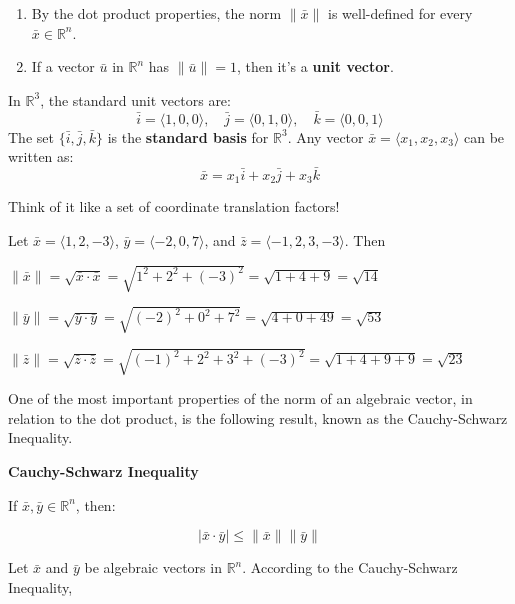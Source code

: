 \begin{notebox}
\begin{enumerate}
\item By the dot product properties, the norm $\|\bar{x}\|$ is well-defined for every $\bar{x} \in \mathbb{R}^n$.
\item If a vector $\bar{u}$ in $\mathbb{R}^n$ has $\|\bar{u}\| = 1$, then it's a \textbf{unit vector}.
\end{enumerate}

In $\mathbb{R}^3$, the standard unit vectors are:
\[
\bar{i} = \langle 1, 0, 0 \rangle, \quad \bar{j} = \langle 0, 1, 0 \rangle, \quad \bar{k} = \langle 0, 0, 1 \rangle
\]
The set $\{\bar{i}, \bar{j}, \bar{k}\}$ is the \textbf{standard basis} for $\mathbb{R}^3$. 
Any vector $\bar{x} = \langle x_1, x_2, x_3 \rangle$ can be written as:
\[
\bar{x} = x_1 \bar{i} + x_2 \bar{j} + x_3 \bar{k}
\]

Think of it like a set of coordinate translation factors!
\end{notebox}

\begin{examplebox}
  Let $\bar{x} = \langle 1,2,-3 \rangle$, $\bar{y} = \langle -2,0,7 \rangle$, and $\bar{z} = \langle -1,2,3,-3 \rangle$. Then

\quad $\|\bar{x}\| = \sqrt{\bar{x} \cdot \bar{x}} = \sqrt{1^2 + 2^2 + (-3)^2} = \sqrt{1 + 4 + 9} = \sqrt{14}$

\quad $\|\bar{y}\| = \sqrt{\bar{y} \cdot \bar{y}} = \sqrt{(-2)^2 + 0^2 + 7^2} = \sqrt{4 + 0 + 49} = \sqrt{53}$

\quad $\|\bar{z}\| = \sqrt{\bar{z} \cdot \bar{z}} = \sqrt{(-1)^2 + 2^2 + 3^2 + (-3)^2} = \sqrt{1 + 4 + 9 + 9} = \sqrt{23}$

\end{examplebox}

One of the most important properties of the norm of an algebraic vector, in relation to the
dot product, is the following result, known as the Cauchy-Schwarz Inequality.

\begin{theorembox}
\textbf{Cauchy-Schwarz Inequality}

If $\bar{x}, \bar{y} \in \mathbb{R}^n$, then:

\[
|\bar{x} \cdot \bar{y}| \leq \|\bar{x}\| \|\bar{y}\|
\]
\end{theorembox}




Let $\bar{x}$ and $\bar{y}$ be algebraic vectors in $\mathbb{R}^n$. 
According to the Cauchy-Schwarz Inequality,

